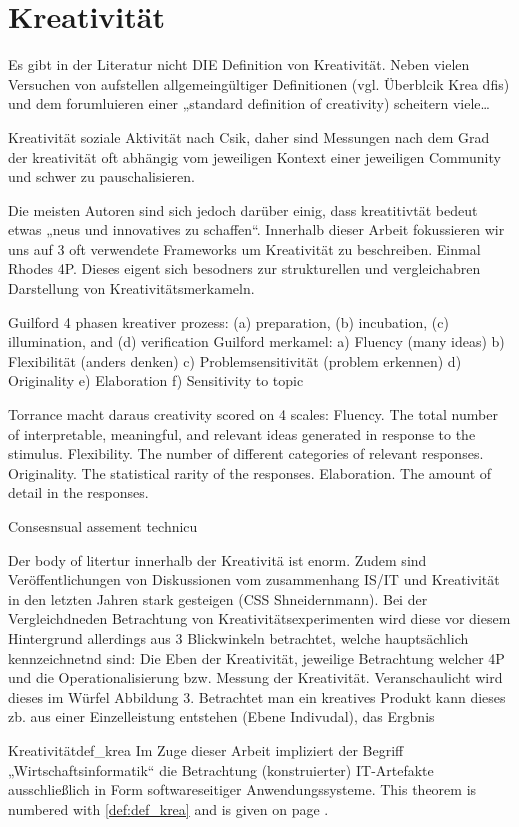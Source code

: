 \section{Kreativität}
Es gibt in der Literatur nicht DIE Definition von Kreativität. Neben vielen Versuchen von aufstellen allgemeingültiger Definitionen (vgl. Überblcik Krea dfis) und dem forumluieren einer „standard definition of creativity) scheitern viele…

Kreativität soziale Aktivität nach Csik, daher sind Messungen nach dem Grad der kreativität oft abhängig vom jeweiligen Kontext einer jeweiligen Community und schwer zu pauschalisieren.

Die meisten Autoren sind sich jedoch darüber einig, dass kreatitivtät bedeut etwas „neus und innovatives zu schaffen“.
Innerhalb dieser Arbeit fokussieren wir uns auf 3 oft verwendete Frameworks um Kreativität zu beschreiben. Einmal Rhodes 4P. Dieses eigent sich besodners zur strukturellen und vergleichabren Darstellung von Kreativitätsmerkameln.

Guilford 4 phasen kreativer prozess: (a) preparation, (b) incubation, (c) illumination, and (d) verification
Guilford merkamel:
a)	Fluency (many ideas)
b)	Flexibilität (anders denken)
c)	Problemsensitivität (problem erkennen)
d)	Originality
e)	Elaboration
f)	Sensitivity to topic

Torrance macht daraus creativity scored on 4 scales:
Fluency. The total number of interpretable, meaningful, and relevant ideas generated in response to the stimulus.
Flexibility. The number of different categories of relevant responses.
Originality. The statistical rarity of the responses.
Elaboration. The amount of detail in the responses.

Consesnsual assement technicu

Der body of litertur innerhalb der Kreativitä ist enorm. Zudem sind Veröffentlichungen von Diskussionen vom zusammenhang IS/IT und Kreativität in den letzten Jahren stark gesteigen (CSS Shneidernmann). Bei der Vergleichdneden Betrachtung von Kreativitätsexperimenten wird diese vor diesem Hintergrund allerdings aus 3 Blickwinkeln betrachtet, welche hauptsächlich kennzeichnetnd sind: Die Eben der Kreativität, jeweilige Betrachtung welcher 4P und die Operationalisierung bzw. Messung der Kreativität. Veranschaulicht wird dieses im Würfel Abbildung 3. Betrachtet man ein kreatives Produkt kann dieses zb. aus einer Einzelleistung entstehen (Ebene Indivudal), das  Ergbnis 

\begin{mydef}{Kreativität}{def_krea}
  Im Zuge dieser Arbeit impliziert der Begriff „Wirtschaftsinformatik“ die Betrachtung (konstruierter) IT-Artefakte ausschließlich in Form softwareseitiger Anwendungssysteme.
  This theorem is numbered with  \ref{def:def_krea} and is given on page \pageref{def:def_krea}.
\end{mydef}
